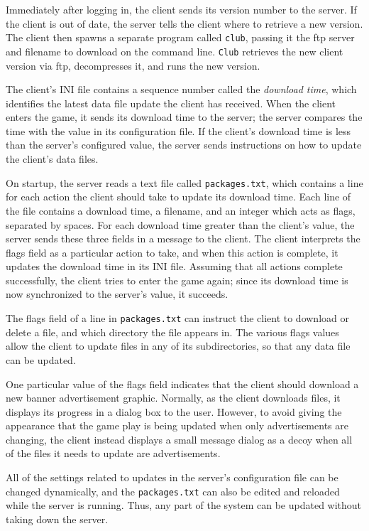 Immediately after logging in, the client sends its version number to
the server.  If the client is out of date, the server tells the client
where to retrieve a new version.  The client then spawns a separate
program called {\tt club}, passing it the ftp server and filename to
download on the command line.  {\tt Club} retrieves the new client
version via ftp, decompresses it, and runs the new version.

The client's INI file contains a sequence number called the {\em
download time}, which identifies the latest data file update the
client has received.  When the client enters the game, it sends its
download time to the server; the server compares the time with the
value in its configuration file.  If the client's download time is
less than the server's configured value, the server sends instructions
on how to update the client's data files.  

On startup, the server reads a text file called {\tt packages.txt},
which contains a line for each action the client should take to update
its download time.  Each line of the file contains a download time, a
filename, and an integer which acts as flags, separated by spaces.
For each download time greater than the client's value, the server
sends these three fields in a message to the client.  The client
interprets the flags field as a particular action to take, and when
this action is complete, it updates the download time in its INI
file.  Assuming that all actions complete successfully, the client
tries to enter the game again; since its download time is now
synchronized to the server's value, it succeeds.

The flags field of a line in {\tt packages.txt} can instruct the
client to download or delete a file, and which directory the file
appears in.  The various flags values allow the client to update files
in any of its subdirectories, so that any data file can be updated.

One particular value of the flags field indicates that the client
should download a new banner advertisement graphic.  Normally, as the
client downloads files, it displays its progress in a dialog box to
the user.  However, to avoid giving the appearance that the game play
is being updated when only advertisements are changing, the client
instead displays a small message dialog as a decoy when all of the
files it needs to update are advertisements.

All of the settings related to updates in the server's configuration
file can be changed dynamically, and the {\tt packages.txt} can also
be edited and reloaded while the server is running.  Thus, any part of
the system can be updated without taking down the server.

